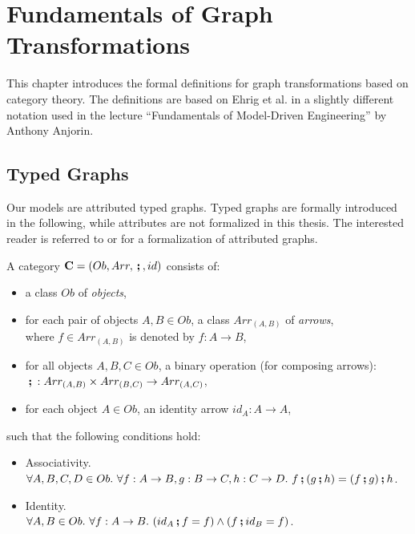 
\chapter{Fundamentals of Graph Transformations}
\label{fundamentals}
This chapter introduces the formal definitions for graph transformations based on category theory.
The definitions are based on Ehrig et al. \cite[pp. 21-47 and pp. 65-71]{FundamentalsOfAlgebraicGT} in a slightly different notation used in the lecture ``Fundamentals of Model-Driven Engineering'' by Anthony Anjorin.

\newcommand{\st}{.~}
\newcommand{\then}{\textbf{\,;\,}}
\newcommand{\gap}{\medskip \noindent}

\newcommand{\Graphs}{\textbf{Graphs}}
\newcommand{\TGraphs}{\textbf{TGraphs}}




\section{Typed Graphs}
\label{fundamentals-typed-graphs}
Our models are attributed typed graphs.
Typed graphs are formally introduced in the following, while attributes are not formalized in this thesis.
The interested reader is referred to \cite{AttributedGraphTransformationViaRuleSchemata} or \cite{ComplexAttributeManipulationInTGGs} for a formalization of attributed graphs.

\begin{definition}[Category]
	\label{def:category}%
	A category $\mathbf{C} = (Ob, Arr, \then , id)$ consists of:
	\begin{itemize}
		\item a class $Ob$ of \emph{objects},
		\item for each pair of objects $A, B \in Ob$, a class $Arr_{(A, B)}$ of \emph{arrows},\\ where $f \in Arr_{(A,B)}$ is denoted by $f: A \rightarrow B$,
		\item for all objects $A, B, C \in Ob$,  a binary operation (for composing arrows):\\ 
		$\then: Arr_{(A,B)} \times Arr_{(B,C)} \rightarrow Arr_{(A,C)}$,
		\item for each object $A \in Ob$, an identity arrow $id_A: A \rightarrow A$,
	\end{itemize}
	such that the following conditions hold:
	\begin{itemize}
		\item Associativity.\\ $\forall A,B,C,D \in Ob\st \forall f: A \rightarrow B, g: B \rightarrow C, h: C \rightarrow D\st f \then (g \then h) = (f \then g) \then h$.
		\item Identity.\\ $\forall A, B \in Ob\st \forall f: A \rightarrow B\st (id_A \then f = f) \wedge (f \then id_B = f)$.
	\end{itemize}
\end{definition}

